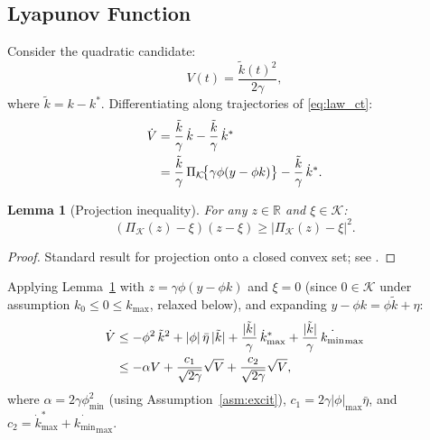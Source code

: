 \documentclass[journal]{IEEEtran}
\newtheorem{lemma}{Lemma}
\newcommand{\ktilde}{\tilde{k}}
\newcommand{\kstar}{k^*}
\newcommand{\kmin}{k_{\min}}
\newcommand{\kmax}{k_{\max}}
\newcommand{\Proj}[1]{\Pi_{#1}}
\newcommand{\calK}{\mathcal{K}}
\begin{document}
\subsection{Lyapunov Function}

Consider the quadratic candidate:
\begin{equation}
  V(t) = \frac{\ktilde(t)^2}{2\gamma},
  \label{eq:lyap}
\end{equation}
where $\ktilde = k - \kstar$.  Differentiating along trajectories of
\eqref{eq:law_ct}:
\begin{align}
  \dot{V} &= \frac{\ktilde}{\gamma}\,\dot{k}
            - \frac{\ktilde}{\gamma}\,\dot{k}^* \notag\\
           &= \frac{\ktilde}{\gamma}\,\Proj{\calK}\!
             \bigl\{\gamma\phi(y - \phi k)\bigr\}
             - \frac{\ktilde}{\gamma}\,\dot{k}^*.
  \label{eq:Vdot_raw}
\end{align}

\begin{lemma}[Projection inequality]
\label{lem:proj}
For any $z \in \mathbb{R}$ and $\xi \in \calK$:
\begin{equation}
  (\Proj{\calK}(z) - \xi)(z - \xi) \geq |\Proj{\calK}(z) - \xi|^2.
  \label{eq:proj_ineq}
\end{equation}
\end{lemma}
\begin{proof}
Standard result for projection onto a closed convex set; see
\cite{Ioannou1996}.
\end{proof}

Applying Lemma~\ref{lem:proj} with $z = \gamma\phi(y-\phi k)$
and $\xi = 0$ (since $0 \in \calK$ under assumption $k_0 \leq 0 \leq \kmax$,
relaxed below), and expanding $y - \phi k = \phi\ktilde + \eta$:
\begin{align}
  \dot{V}
  &\leq -\phi^2\,\ktilde^2 + |\phi|\,\bar{\eta}\,|\ktilde|
        + \frac{|\ktilde|}{\gamma}\,\dot{k}^*_{\max}
        + \frac{|\ktilde|}{\gamma}\,\dot{\kmin}_{\max} \notag\\
  &\leq -\alpha V + \frac{c_1}{\sqrt{2\gamma}}\sqrt{V}
        + \frac{c_2}{\sqrt{2\gamma}}\sqrt{V},
  \label{eq:Vdot_bound}
\end{align}
where $\alpha = 2\gamma\phi^2_{\min}$ (using Assumption~\ref{asm:excit}),
$c_1 = 2\gamma|\phi|_{\max}\bar{\eta}$, and
$c_2 = \dot{k}^*_{\max} + \dot{\kmin}_{\max}$.
\end{document}
